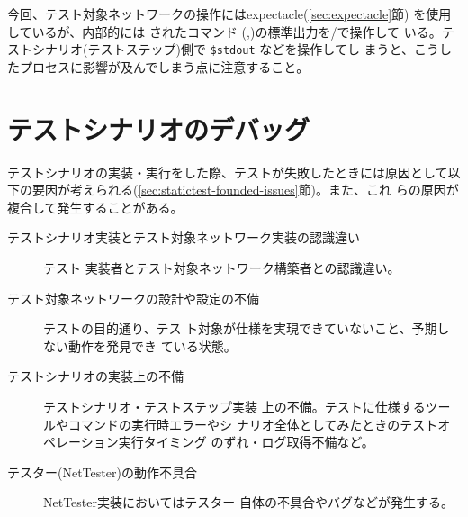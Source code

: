 今回、テスト対象ネットワークの操作にはexpectacle(\ref{sec:expectacle}節)
を使用しているが、内部的には  されたコマンド
(,)の標準出力を/で操作して
いる。テストシナリオ(テストステップ)側で \verb|$stdout| などを操作してし
まうと、こうしたプロセスに影響が及んでしまう点に注意すること。


 \section{テストシナリオのデバッグ}

テストシナリオの実装・実行をした際、テストが失敗したときには原因として以
下の要因が考えられる(\ref{sec:statictest-founded-issues}節)。また、これ
らの原因が複合して発生することがある。
\begin{description}
 \item[テストシナリオ実装とテスト対象ネットワーク実装の認識違い] テスト
            実装者とテスト対象ネットワーク構築者との認識違い。
 \item[テスト対象ネットワークの設計や設定の不備] テストの目的通り、テス
            ト対象が仕様を実現できていないこと、予期しない動作を発見でき
            ている状態。
 \item[テストシナリオの実装上の不備] テストシナリオ・テストステップ実装
            上の不備。テストに仕様するツールやコマンドの実行時エラーやシ
            ナリオ全体としてみたときのテストオペレーション実行タイミング
            のずれ・ログ取得不備など。
 \item[テスター(NetTester)の動作不具合] NetTester実装においてはテスター
            自体の不具合やバグなどが発生する。
\end{description}


